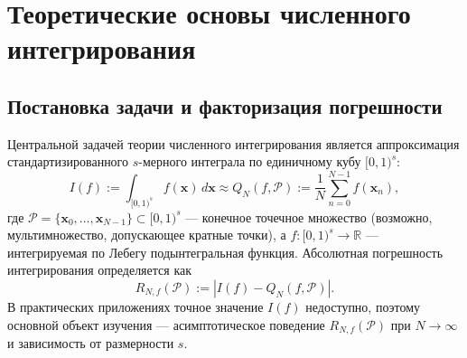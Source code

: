 \documentclass[12pt, a4paper]{article}
\theoremstyle{plain}
\theoremstyle{definition}
\theoremstyle{remark}
\newcommand{\RR}{\mathbb{R}}
\newcommand{\II}{[0, 1)}
\newcommand{\PP}{\mathcal{P}}
\newcommand{\vx}{\boldsymbol{x}}
\begin{document}
\section{Теоретические основы численного интегрирования}


\subsection{Постановка задачи и факторизация погрешности}

Центральной задачей теории численного интегрирования является аппроксимация стандартизированного $s$-мерного интеграла по единичному кубу $\II^s$:
\[
I(f) := \int_{\II^s} f(\vx) \, d\vx \approx Q_N(f, \PP) := \frac{1}{N} \sum_{n=0}^{N-1} f(\vx_n),
\]
где $\PP = \{\vx_0, \dots, \vx_{N-1}\} \subset \II^s$ --- конечное точечное множество (возможно, мультимножество, допускающее кратные точки), а $f \colon \II^s \to \RR$ --- интегрируемая по Лебегу подынтегральная функция. Абсолютная погрешность интегрирования определяется как
\[
R_{N,f}(\PP) := \left| I(f) - Q_N(f, \PP) \right|.
\]
В практических приложениях точное значение $I(f)$ недоступно, поэтому основной объект изучения --- асимптотическое поведение $R_{N,f}(\PP)$ при $N \to \infty$ и зависимость от размерности $s$.
\end{document}
